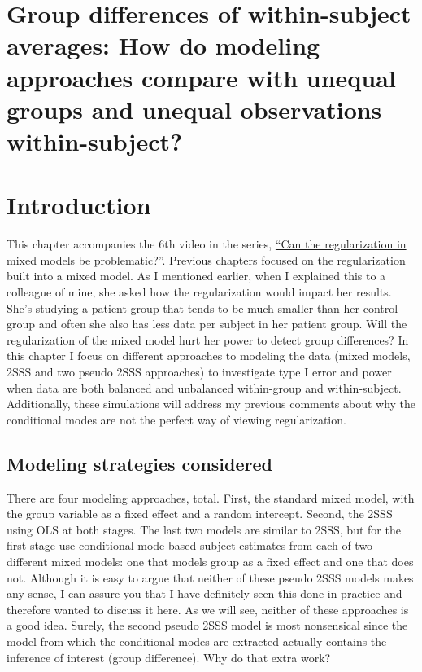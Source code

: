 \documentclass[
]{book}
\begin{document}
\hypertarget{group-differences-of-within-subject-averages-how-do-modeling-approaches-compare-with-unequal-groups-and-unequal-observations-within-subject}{%
\section{Group differences of within-subject averages: How do modeling approaches compare with unequal groups and unequal observations within-subject?}\label{group-differences-of-within-subject-averages-how-do-modeling-approaches-compare-with-unequal-groups-and-unequal-observations-within-subject}}

\hypertarget{introduction-4}{%
\section{Introduction}\label{introduction-4}}

This chapter accompanies the 6th video in the series, \href{https://youtu.be/C4r20a_pqlA}{``Can the regularization in mixed models be problematic?''}. Previous chapters focused on the regularization built into a mixed model. As I mentioned earlier, when I explained this to a colleague of mine, she asked how the regularization would impact her results. She's studying a patient group that tends to be much smaller than her control group and often she also has less data per subject in her patient group. Will the regularization of the mixed model hurt her power to detect group differences? In this chapter I focus on different approaches to modeling the data (mixed models, 2SSS and two pseudo 2SSS approaches) to investigate type I error and power when data are both balanced and unbalanced within-group and within-subject. Additionally, these simulations will address my previous comments about why the conditional modes are not the perfect way of viewing regularization.

\hypertarget{modeling-strategies-considered}{%
\subsection{Modeling strategies considered}\label{modeling-strategies-considered}}

There are four modeling approaches, total. First, the standard mixed model, with the group variable as a fixed effect and a random intercept. Second, the 2SSS using OLS at both stages. The last two models are similar to 2SSS, but for the first stage use conditional mode-based subject estimates from each of two different mixed models: one that models group as a fixed effect and one that does not. Although it is easy to argue that neither of these pseudo 2SSS models makes any sense, I can assure you that I have definitely seen this done in practice and therefore wanted to discuss it here. As we will see, neither of these approaches is a good idea. Surely, the second pseudo 2SSS model is most nonsensical since the model from which the conditional modes are extracted actually contains the inference of interest (group difference). Why do that extra work?
\end{document}
